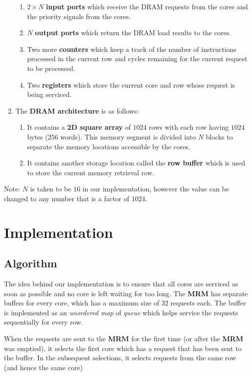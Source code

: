 \documentclass{article}
\begin{document}
\begin{enumerate}
\begin{enumerate}
            \item $2\times N$ \textbf{input ports} which receive the DRAM requests from the cores and the priority signals from the cores.
            \item $N$ \textbf{output ports} which return the DRAM load results to the cores.
            \item Two more \textbf{counters} which keep a track of the number of instructions processed in the current row and cycles remaining for the current request to be processed.
            \item Two \textbf{registers} which store the current core and row whose request is being serviced.
        \end{enumerate}
    \item The \textbf{DRAM architecture} is as follows:
        \begin{enumerate}
            \item It contains a \textbf{2D square array} of $1024$ rows with each row having $1024$ bytes ($256$ words). This memory segment is divided into $N$ blocks to separate the memory locations accessible by the cores.
            \item It contains another storage location called the \textbf{row buffer} which is used to store the current memory retrieval row.
        \end{enumerate}
\end{enumerate}
Note: $N$ is taken to be $16$ in our implementation, however the value can be changed to any number that is a factor of $1024$.


\section{Implementation}

\subsection{Algorithm}
The idea behind our implementation is to ensure that all cores are serviced as soon as possible and no core is left waiting for too long. The \textbf{MRM} has separate buffers for every core, which has a maximum size of $32$ requests each. The buffer is implemented as an \textit{unordered map} of \textit{queue} which helps service the requests sequentially for every row.\par
When the requests are sent to the \textbf{MRM} for the first time (or after the \textbf{MRM} was emptied), it selects the first core which has a request that has been sent to the buffer. In the subsequent selections, it selects requests from the same row (and hence the same core)
\end{document}
